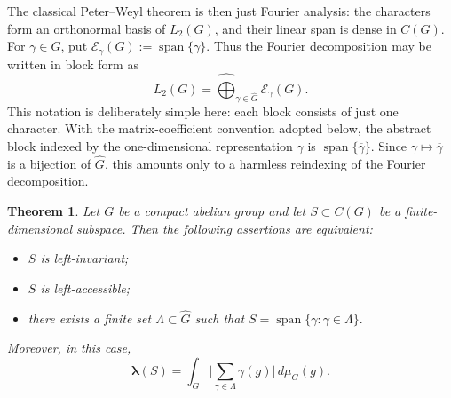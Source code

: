 \documentclass[11pt,showkeys]{amsart}
\newtheorem{theorem}{Theorem}[section]
\begin{document}
The classical Peter--Weyl theorem is then just Fourier analysis: the
characters form an orthonormal basis of \(L_2(G)\), and their linear
span is dense in \(C(G)\).
For \(\gamma\in\widehat G\), put
\(
        \mathcal E_\gamma(G):=\operatorname{span}\{\gamma\}.
\)
Thus the Fourier decomposition may be written in block form as
\[
        L_2(G)
        =
        \widehat{\bigoplus}_{\gamma\in\widehat G}
        \mathcal E_\gamma(G).
\]
This notation is deliberately simple here: each block consists of just
one character. With the matrix-coefficient convention adopted below,
the abstract block indexed by the one-dimensional representation
\(\gamma\) is \(\operatorname{span}\{\overline\gamma\}\). Since
\(\gamma\mapsto\overline\gamma\) is a bijection of \(\widehat G\), this
amounts only to a harmless reindexing of the Fourier decomposition.





\begin{theorem}\label{thm:abelian-accessibility}
Let $G$ be a compact abelian group and let $S\subset C(G)$ be a
finite-dimensional subspace. Then the following assertions are equivalent:
\begin{itemize}
    \item[(1)] $S$ is left-invariant;
    \item[(2)] $S$ is left-accessible;
    \item[(3)] there exists a finite set $\Lambda\subset\widehat{G}$ such that
    \(
        S=\operatorname{span}\{\gamma:\gamma\in\Lambda\}.
    \)
\end{itemize}
Moreover, in this case,
\[
        \boldsymbol\lambda(S)
        =
        \int_G
        \Big|
             \sum_{\gamma\in\Lambda}\gamma(g)
        \Big|
        \,d\mu_G(g).
\]
\end{theorem}
\end{document}
